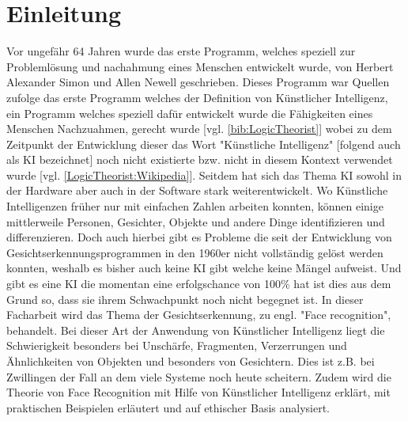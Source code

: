 \section{Einleitung}
\label{sec:einleitung}
Vor ungefähr 64 Jahren wurde das erste Programm, welches speziell zur Problemlösung und nachahmung eines Menschen entwickelt wurde, von Herbert Alexander Simon und Allen Newell geschrieben. Dieses Programm war Quellen zufolge das erste Programm welches der Definition von Künstlicher Intelligenz, ein Programm welches speziell dafür entwickelt wurde die Fähigkeiten eines Menschen Nachzuahmen, gerecht wurde [vgl. \ref{bib:LogicTheorist}] wobei zu dem Zeitpunkt der Entwicklung dieser das Wort "Künstliche Intelligenz" [folgend auch als KI bezeichnet] noch nicht existierte bzw. nicht in diesem Kontext verwendet wurde [vgl. \ref{LogicTheorist:Wikipedia}]. Seitdem hat sich das Thema KI sowohl in der Hardware aber auch in der Software stark weiterentwickelt. Wo Künstliche Intelligenzen früher nur mit einfachen Zahlen arbeiten konnten, können einige mittlerweile Personen, Gesichter, Objekte und andere Dinge identifizieren und differenzieren. Doch auch hierbei gibt es Probleme die seit der Entwicklung von Gesichtserkennungsprogrammen in den 1960er nicht vollständig gelöst werden konnten, weshalb es bisher auch keine KI gibt welche keine Mängel aufweist. Und gibt es eine KI die momentan eine erfolgschance von 100\% hat ist dies aus dem Grund so, dass sie ihrem Schwachpunkt noch nicht begegnet ist. In dieser Facharbeit wird das Thema der Gesichtserkennung, zu engl. "Face recognition", behandelt. Bei dieser Art der Anwendung von Künstlicher Intelligenz liegt die Schwierigkeit besonders bei Unschärfe, Fragmenten, Verzerrungen und Ähnlichkeiten von Objekten und besonders von Gesichtern. Dies ist z.B. bei Zwillingen der Fall an dem viele Systeme noch heute scheitern. Zudem wird die Theorie von Face Recognition mit Hilfe von Künstlicher Intelligenz erklärt, mit praktischen Beispielen erläutert und auf ethischer Basis analysiert.